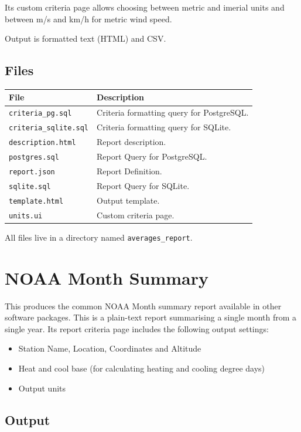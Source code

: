 \documentclass[a4paper,10pt]{book}
\begin{document}
Its custom criteria page allows choosing between metric and imerial units and between m/s and km/h for metric wind speed.

Output is formatted text (HTML) and CSV.

\subsection{Files}

\begin{tabular}{p{4.5cm} l}
\hline
\textbf{File} & \textbf{Description} \\
\hline
\verb|criteria_pg.sql| & Criteria formatting query for PostgreSQL.\\
\verb|criteria_sqlite.sql| & Criteria formatting query for SQLite.\\
\verb|description.html| & Report description.\\
\verb|postgres.sql| & Report Query for PostgreSQL. \\
\verb|report.json| & Report Definition. \\
\verb|sqlite.sql| & Report Query for SQLite. \\
\verb|template.html| & Output template. \\
\verb|units.ui| & Custom criteria page. \\
\hline
\end{tabular}

All files live in a directory named \verb|averages_report|.

\section{NOAA Month Summary}
This produces the common NOAA Month summary report available in other software packages. This is a plain-text report  summarising a single month from a single year. Its report criteria page includes the following output settings:
\begin{itemize}
\item Station Name, Location, Coordinates and Altitude
\item Heat and cool base (for calculating heating and cooling degree days)
\item Output units
\end{itemize}

\subsection{Output}
\end{document}
